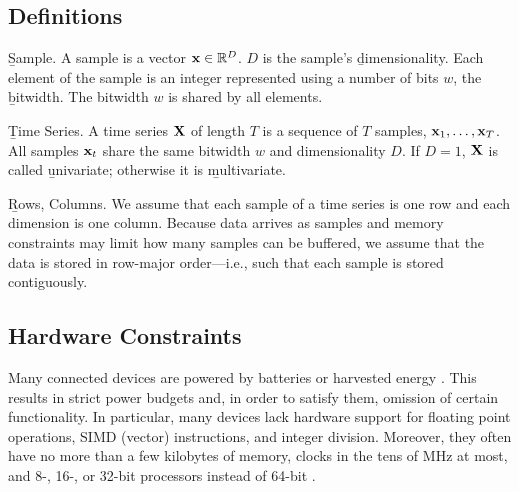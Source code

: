 \subsection{Definitions}
\begin{Definition} \b{Sample.} A sample is a vector $\mathbf{x} \in \mathbb{R}^D$. $D$ is the sample's \b{dimensionality}. Each element of the sample is an integer represented using a number of bits $w$, the \b{bitwidth}. The bitwidth $w$ is shared by all elements.
\end{Definition}
\begin{Definition} \b{Time Series.} A time series $\mathbf{X}$ of length $T$ is a sequence of $T$ samples, $\mathbf{x}_1,\ldots,\mathbf{x}_T$. All samples $\mathbf{x}_t$ share the same bitwidth $w$ and dimensionality $D$. If $D = 1$, $\mathbf{X}$ is called \b{univariate}; otherwise it is \b{multivariate}.
\end{Definition}
\begin{Definition} \b{Rows, Columns.} We assume that each sample of a time series is one row and each dimension is one column. Because data arrives as samples and memory constraints may limit how many samples can be buffered, we assume that the data is stored in row-major order---i.e., such that each sample is stored contiguously.
\end{Definition}

\subsection{Hardware Constraints}

Many connected devices are powered by batteries or harvested energy \cite{bsnChallenges}. This results in strict power budgets and, in order to satisfy them, omission of certain functionality. In particular, many devices lack hardware support for floating point operations, SIMD (vector) instructions, and integer division. Moreover, they often have no more than a few kilobytes of memory, clocks in the tens of MHz at most, and 8-, 16-, or 32-bit processors instead of 64-bit \cite{cc2540, cc2640, quark}.

